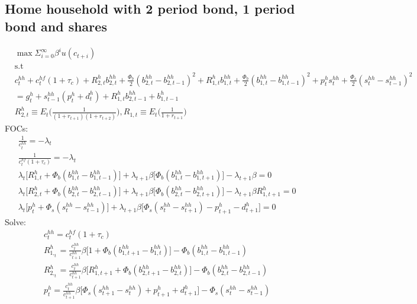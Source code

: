 \documentclass[a4paper]{article}
\begin{document}
\subsection{Home household with 2 period bond, 1 period bond and shares}
\begin{align*}
&\max \Sigma_{i=0}^\infty \beta^i u(c_{t+i})\\ &\text{s.t}\\
&c^{hh}_t+c^{hf}_t(1+\tau_c)+R^h_{2,t} b^{hh}_{2,t} + \frac{\Phi_b}{2}(b^{hh}_{2,t}-b^{hh}_{2,t-1})^2 +
R^h_{1,t} b^{hh}_{1,t} + \frac{\Phi_b}{2}(b^{hh}_{1,t}-b^{hh}_{1,t-1})^2 + p^{h}_t s^{hh}_t+\frac{\Phi_s}{2}(s^{hh}_t-s^{hh}_{t-1})^2\\
&=g^h_t+s^{hh}_{t-1}(p^{h}_t+d^{h}_t)+R^{h}_{1,t}b^{hh}_{2,t-1}+b^h_{1,t-1}\\
&R^h_{2,t} \equiv E_t\bigg(\frac{1}{(1+r_{t+1})(1+r_{t+2})} \bigg), R_{1,t} \equiv E_t\bigg(\frac{1}{1+r_{t+1}} \bigg)
\end{align*}
FOCs:
\begin{align*}
&\frac{1}{c^{hh}_t}=-\lambda_t\\
&\frac{1}{c^{hf}_t(1+\tau_c)}=-\lambda_t \\
&\lambda_t\big[R^h_{1,t}+\Phi_b (b^{hh}_{1,t}-b^{hh}_{1,t-1})\big ]+ \lambda_{t+1} \beta \big[\Phi_b (b^{hh}_{1,t} - b^{hh}_{1,t+1})]-\lambda_{t+1}\beta =0\\
&\lambda_t\big[R^h_{2,t}+\Phi_b (b^{hh}_{2,t}-b^{hh}_{2,t-1})\big ]+ \lambda_{t+1} \beta \big[\Phi_b (b^{hh}_{2,t} - b^{hh}_{2,t+1})]-\lambda_{t+1}\beta R^{h}_{1,t+1}=0\\
&\lambda_t \big[p^{h}_t + \Phi_s (s^{hh}_t-s^{hh}_{t-1})\big] + \lambda_{t+1} \beta \big[\Phi_s  (s^{hh}_t-s^{hh}_{t+1}) - p^{h}_{t+1}-d^{h}_{t+1}\big]=0
\end{align*}
Solve:
\begin{align}
&c^{hh}_t=c^{hf}_t(1+\tau_c)\\
&R^h_{1,_t}=\frac{c^{hh}_t}{c^{hh}_{t+1}}\beta \big[1+\Phi_b (b^{hh}_{1,t+1} - b^{hh}_{1,t})\big] -\Phi_b (b^{hh}_{1,t}-b^{hh}_{1,t-1})\\
&R^h_{2,_t}=\frac{c^{hh}_t}{c^{hh}_{t+1}}\beta \big[R^{h}_{1,t+1}+\Phi_b (b^{hh}_{2,t+1} - b^{hh}_{2,t})\big] -\Phi_b (b^{hh}_{2,t}-b^{hh}_{2,t-1})\\
&p^{h}_t=\frac{c^{hh}_t}{c^{hh}_{t+1}}\beta \bigg[ \Phi_s (s^{hh}_{t+1}-s^{hh}_t)+p^{h}_{t+1}+d^{h}_{t+1} \bigg] - \Phi_s (s^{hh}_t - s^{hh}_{t-1})
\end{align}
\end{document}
